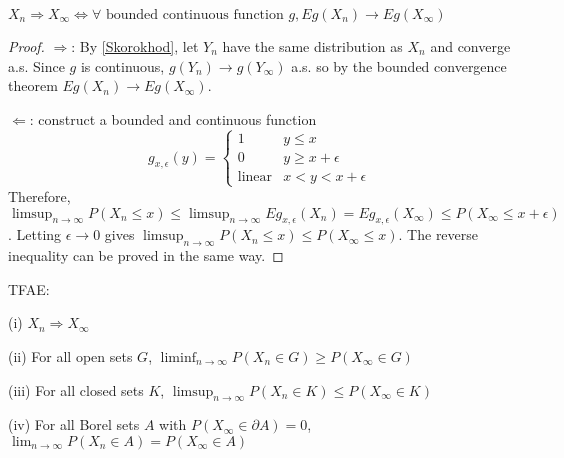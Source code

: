 \begin{theorem}
$X_n\Longrightarrow X_\infty\Longleftrightarrow\forall\text{ bounded continuous function }g, Eg(X_n)\longrightarrow Eg(X_\infty)$
\end{theorem}
\begin{proof}
$\Longrightarrow$: By \ref{Skorokhod}, let $Y_n$ have the same distribution as $X_n$ and converge a.s. Since $g$ is continuous, $g(Y_n)\longrightarrow g(Y_\infty)$ a.s. so by the bounded convergence theorem $Eg(X_n)\longrightarrow Eg(X_\infty)$.\par
$\Longleftarrow$: construct a bounded and continuous function\[g_{x,\epsilon}(y)=\left\{\begin{matrix}
 1 &y\le x \\
 0 & y\ge x+\epsilon\\
 \text{linear} & x< y< x+\epsilon
\end{matrix}\right.\]
Therefore, $\limsup_{n\to\infty} P(X_n\le x)\le \limsup_{n\to\infty} Eg_{x,\epsilon}(X_n)=Eg_{x,\epsilon}(X_\infty)\le P(X_\infty\le x+\epsilon)$. Letting $\epsilon\to 0$ gives $\limsup_{n\to\infty}P(X_n\le x)\le P(X_\infty\le x)$. The reverse inequality can be proved in the same way.
\end{proof}
\begin{theorem}

\end{theorem}

\begin{theorem}
TFAE:\par
(i) $X_n\Longrightarrow X_\infty$\par
(ii) For all open sets $G$, $\liminf_{n\to\infty}P(X_n\in G)\ge P(X_\infty\in G)$\par
(iii) For all closed sets $K$, $\limsup_{n\to\infty}P(X_n\in K)\le P(X_\infty\in K)$\par
(iv) For all Borel sets $A$ with $P(X_\infty\in\partial A)=0$, $\lim_{n\to\infty}P(X_n\in A)=P(X_\infty\in A)$
\end{theorem}

